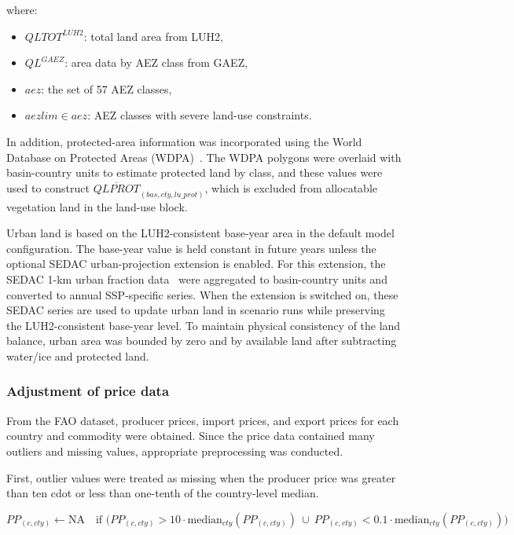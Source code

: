 where:
\begin{itemize}
\item \( QLTOT^{LUH2} \): total land area from LUH2,
\item \( QL^{GAEZ} \): area data by AEZ class from GAEZ,
\item \( aez \): the set of 57 AEZ classes,
\item \( aezlim \in aez \): AEZ classes with severe land-use constraints.
\end{itemize}

In addition, protected-area information was incorporated using the World Database on Protected Areas (WDPA)~\cite{iucnUNEPWCMCWorldDatabase2025}.  
The WDPA polygons were overlaid with basin-country units to estimate protected land by class, and these values were used to construct \(\overline{QLPROT}_{(bas,cty,lu\_prot)}\), which is excluded from allocatable vegetation land in the land-use block.

Urban land is based on the LUH2-consistent base-year area in the default model configuration.  
The base-year value is held constant in future years unless the optional SEDAC urban-projection extension is enabled.  
For this extension, the SEDAC 1-km urban fraction data~\cite{gaoGlobal1kmDownscaled2021,gaoDownscalingSSPconsistent2021} were aggregated to basin-country units and converted to annual SSP-specific series.  
When the extension is switched on, these SEDAC series are used to update urban land in scenario runs while preserving the LUH2-consistent base-year level.  
To maintain physical consistency of the land balance, urban area was bounded by zero and by available land after subtracting water/ice and protected land.


\subsubsection{Adjustment of price data}

From the FAO dataset, producer prices, import prices, and export prices 
for each country and commodity were obtained. 
Since the price data contained many outliers and missing values, 
appropriate preprocessing was conducted.  

First, outlier values were treated as missing when the producer price 
was greater than ten cdot or less than one-tenth of the country-level median.

\begin{equation}
PP_{(c,cty)} \leftarrow \text{NA} 
\quad \text{if } 
\big( PP_{(c,cty)} > 10 \cdot \text{median}_{cty}(PP_{(c,cty)}) 
\ \cup \ 
PP_{(c,cty)} < 0.1 \cdot \text{median}_{cty}(PP_{(c,cty)}) \big)
\end{equation}

